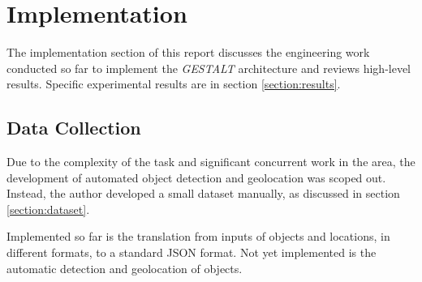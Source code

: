 \section{Implementation}
\label{section:implementation}

The implementation section of this report discusses the engineering work conducted so far to implement the \textit{GESTALT} architecture and reviews high-level results. Specific experimental results are in section \ref{section:results}.

\subsection{Data Collection}
Due to the complexity of the task and significant concurrent work in the area, the development of automated object detection and geolocation was scoped out. 
Instead, the author developed a small dataset manually, as discussed in section \ref{section:dataset}. 


Implemented so far is the translation from inputs of objects and locations, in different formats, to a standard JSON format. Not yet implemented is the automatic detection and geolocation of objects. 

